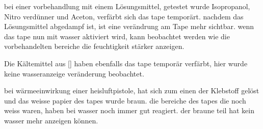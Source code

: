 bei einer vorbehandlung mit einem Lösungsmittel, getestet wurde Isopropanol, Nitro verdünner und Aceton, verfärbt sich das tape temporärt. nachdem das Lösungsmittel abgedampf ist, ist eine verändrung am Tape mehr sichtbar. wenn das tape nun mit wasser aktiviert wird, kann beobachtet werden wie die vorbehandelten bereiche die feuchtigkeit stärker anzeigen.

Die Kältemittel aus \ref{} haben ebenfalls das tape temporär verfärbt, hier wurde keine wasseranzeige veränderung beobachtet.

bei wärmeeinwirkung einer heisluftpistole, hat sich zum einen der Klebstoff gelöst und das weisse papier des tapes wurde braun. die bereiche des tapes die noch weiss waren, haben bei wasser noch immer gut reagiert. der braune teil hat kein wasser mehr anzeigen können.
